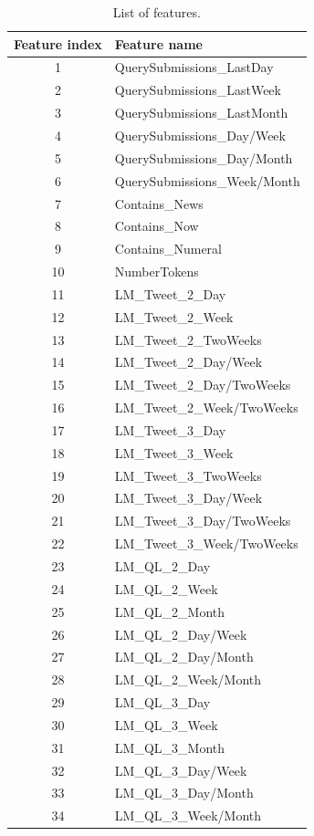 \begin{table}[]
\centering
\caption{List of features.}
\label{tb:features-query}
\begin{tabular}{@{}cl@{}}
\toprule
Feature index & Feature name \\ \midrule
1 & QuerySubmissions\_LastDay \\
2 & QuerySubmissions\_LastWeek \\
3 & QuerySubmissions\_LastMonth \\
4 & QuerySubmissions\_Day/Week \\
5 & QuerySubmissions\_Day/Month \\
6 & QuerySubmissions\_Week/Month \\
7 & Contains\_News \\
8 & Contains\_Now \\
9 & Contains\_Numeral \\
10 & NumberTokens \\
11 & LM\_Tweet\_2\_Day \\
12 & LM\_Tweet\_2\_Week \\
13 & LM\_Tweet\_2\_TwoWeeks \\
14 & LM\_Tweet\_2\_Day/Week \\
15 & LM\_Tweet\_2\_Day/TwoWeeks \\
16 & LM\_Tweet\_2\_Week/TwoWeeks \\
17 & LM\_Tweet\_3\_Day \\
18 & LM\_Tweet\_3\_Week \\
19 & LM\_Tweet\_3\_TwoWeeks \\
20 & LM\_Tweet\_3\_Day/Week \\
21 & LM\_Tweet\_3\_Day/TwoWeeks \\
22 & LM\_Tweet\_3\_Week/TwoWeeks \\
23 & LM\_QL\_2\_Day \\
24 & LM\_QL\_2\_Week \\
25 & LM\_QL\_2\_Month \\
26 & LM\_QL\_2\_Day/Week \\
27 & LM\_QL\_2\_Day/Month \\
28 & LM\_QL\_2\_Week/Month \\
29 & LM\_QL\_3\_Day \\
30 & LM\_QL\_3\_Week \\
31 & LM\_QL\_3\_Month \\
32 & LM\_QL\_3\_Day/Week \\
33 & LM\_QL\_3\_Day/Month \\
34 & LM\_QL\_3\_Week/Month \\ \bottomrule
\end{tabular}
\end{table}

